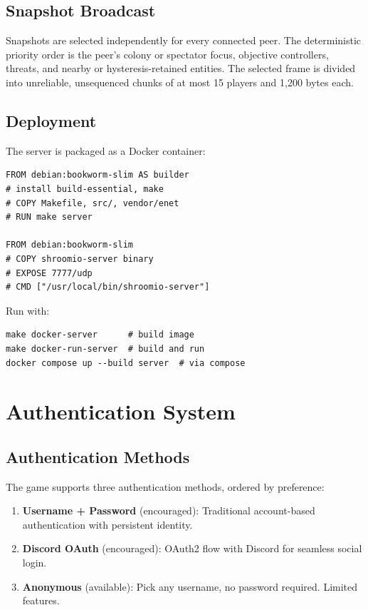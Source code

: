 \documentclass[11pt]{article}
\begin{document}
\subsection{Snapshot Broadcast}

Snapshots are selected independently for every connected peer. The deterministic priority order is the peer's colony or spectator focus, objective controllers, threats, and nearby or hysteresis-retained entities. The selected frame is divided into unreliable, unsequenced chunks of at most 15 players and 1,200 bytes each.

\subsection{Deployment}

The server is packaged as a Docker container:

\begin{verbatim}
FROM debian:bookworm-slim AS builder
# install build-essential, make
# COPY Makefile, src/, vendor/enet
# RUN make server

FROM debian:bookworm-slim
# COPY shroomio-server binary
# EXPOSE 7777/udp
# CMD ["/usr/local/bin/shroomio-server"]
\end{verbatim}

\noindent Run with:
\begin{verbatim}
make docker-server      # build image
make docker-run-server  # build and run
docker compose up --build server  # via compose
\end{verbatim}

\section{Authentication System}

\subsection{Authentication Methods}

The game supports three authentication methods, ordered by preference:

\begin{enumerate}
  \item \textbf{Username + Password} (encouraged): Traditional account-based authentication with persistent identity.
  \item \textbf{Discord OAuth} (encouraged): OAuth2 flow with Discord for seamless social login.
  \item \textbf{Anonymous} (available): Pick any username, no password required. Limited features.
\end{enumerate}
\end{document}
